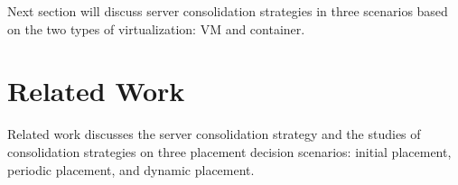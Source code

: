 






Next section will discuss server consolidation strategies in three scenarios based on the two types of virtualization: VM and container.


\section{Related Work}
\label{sec:related_work}
Related work discusses the server consolidation strategy and the studies of consolidation strategies on three placement decision scenarios: initial placement, periodic placement, and dynamic placement. 

